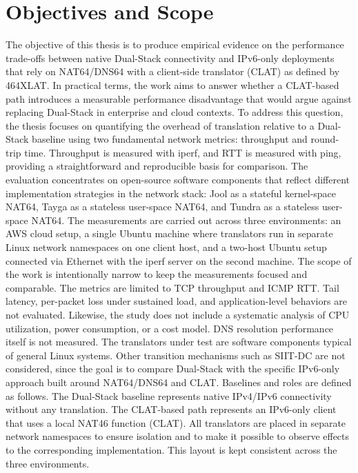 \section{Objectives and Scope}
The objective of this thesis is to produce empirical evidence on the performance trade-offs between native Dual-Stack connectivity and IPv6-only deployments that rely on NAT64/DNS64 with a client-side translator (CLAT) as defined by 464XLAT. In practical terms, the work aims to answer whether a CLAT-based path introduces a measurable performance disadvantage that would argue against replacing Dual-Stack in enterprise and cloud contexts. 
To address this question, the thesis focuses on quantifying the overhead of translation relative to a Dual-Stack baseline using two fundamental network metrics: throughput and round-trip time. Throughput is measured with iperf, and RTT is measured with ping, providing a straightforward and reproducible basis for comparison. The evaluation concentrates on open-source software components that reflect different implementation strategies in the network stack: Jool as a stateful kernel-space NAT64, Tayga as a stateless user-space NAT64, and Tundra as a stateless user-space NAT64. 
The measurements are carried out across three environments: an AWS cloud setup, a single Ubuntu machine where translators run in separate Linux network namespaces on one client host, and a two-host Ubuntu setup connected via Ethernet with the iperf server on the second machine. 
The scope of the work is intentionally narrow to keep the measurements focused and comparable. The metrics are limited to TCP throughput and ICMP RTT. Tail latency, per-packet loss under sustained load, and application-level behaviors are not evaluated. Likewise, the study does not include a systematic analysis of CPU utilization, power consumption, or a cost model. DNS resolution performance itself is not measured. The translators under test are software components typical of general Linux systems. Other transition mechanisms such as SIIT-DC are not considered, since the goal is to compare Dual-Stack with the specific IPv6-only approach built around NAT64/DNS64 and CLAT.
Baselines and roles are defined as follows. The Dual-Stack baseline represents native IPv4/IPv6 connectivity without any translation. The CLAT-based path represents an IPv6-only client that uses a local NAT46 function (CLAT). All translators are placed in separate network namespaces to ensure isolation and to make it possible to observe effects to the corresponding implementation. This layout is kept consistent across the three environments.
